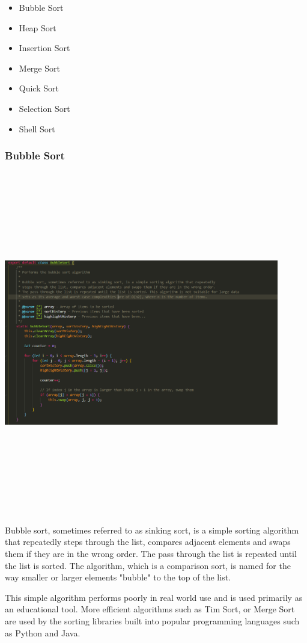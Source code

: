 \begin{itemize}
    \item Bubble Sort
    \item Heap Sort
    \item Insertion Sort
    \item Merge Sort
    \item Quick Sort
    \item Selection Sort
    \item Shell Sort
\end{itemize}

\subsubsection{Bubble Sort}
\begin{center}
    \includegraphics[width=12cm,height=15cm,keepaspectratio]{images/bubblesort}
\end{center}
Bubble sort, sometimes referred to as sinking sort, is a simple sorting algorithm that repeatedly steps through the list, compares adjacent elements and swaps them if they are in the wrong order. The pass through the list is repeated until the list is sorted. The algorithm, which is a comparison sort, is named for the way smaller or larger elements "bubble" to the top of the list.
\par
\bigskip
This simple algorithm performs poorly in real world use and is used primarily as an educational tool. More efficient algorithms such as Tim Sort, or Merge Sort are used by the sorting libraries built into popular programming languages such as Python and Java.

